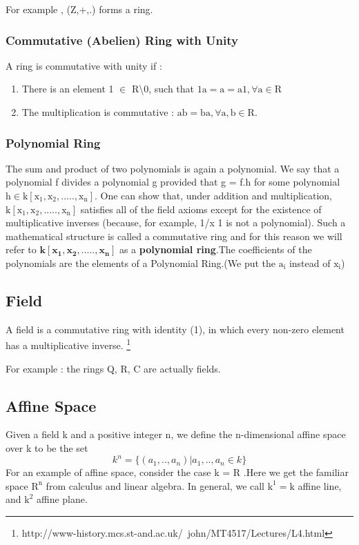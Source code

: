 \documentclass[11pt]{article}
\begin{document}
For example , (Z,+,.) forms a ring.

\subsubsection{Commutative (Abelien) Ring with Unity}
A ring is commutative with unity if :
\begin{enumerate}
\item There is an element 1 $\mathrm{\in}$  R\textbackslash0, such that $\mathrm{ 1a=a=a1 , \forall a \in R}$
\item The multiplication is commutative : $\mathrm{ ab=ba , \forall a,b \in R}$.
\end{enumerate}

\subsubsection{Polynomial Ring}
The sum and product of two polynomials is again a polynomial. We say that a
polynomial f divides a polynomial g provided that g = f.h for some polynomial
$\mathrm{ h \in k[x_{1},x_2,.....,x_n]}$.\newline
One can show that, under addition and multiplication, $\mathrm{k[x_{1},x_2,.....,x_n]}$ satisfies all of the field axioms except for the existence of multiplicative inverses (because, for example, 1/x 1 is not a polynomial). \newline
Such a mathematical structure is called a commutative ring and for this reason we will
refer to $\mathbf{k[x_{1},x_2,.....,x_n]}$ as a \textbf{polynomial ring}.The coefficients of the polynomials are the elements of a Polynomial Ring.(We put the $\mathrm{a_i}$ instead of $\mathrm{x_i}$)



\subsection{Field}
A field is a commutative ring with identity (1), in which every non-zero element has a multiplicative inverse. \footnote{http://www-history.mcs.st-and.ac.uk/~john/MT4517/Lectures/L4.html}

For example : the rings Q, R, C are actually fields.

\subsection{Affine Space}
Given a field k and a positive integer n, we define the n-dimensional
affine space over k to be the set
\begin{equation}
 k^n =\{(a_1,..,a_n)| a_1, .. ,a_n \in k \}
\end{equation}
For an example of affine space, consider the case k = $\mathrm{R}$ .Here we get the familiar space $\mathrm{R^n}$ from calculus and linear algebra. In general, we call
$\mathrm{k^1=k}$ affine line, and $\mathrm{k^2}$ affine plane.\newline
\end{document}
